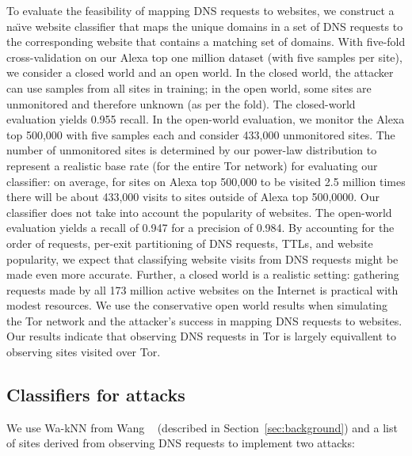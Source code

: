 To evaluate the feasibility of mapping DNS requests to websites, we
construct a na\"{\i}ve website classifier that maps the unique domains
in a set of DNS requests to the corresponding website that contains a
matching set of domains.  With five-fold cross-validation on our Alexa
top one million dataset (with five samples per site),
we consider a closed world and an open world.
In the closed world, the attacker can use samples
from all sites in training; in the open world, some sites
are unmonitored and therefore unknown (as per the fold).  The
closed-world evaluation yields 0.955 recall.  In the open-world
evaluation, we monitor the Alexa top 500,000 with five samples each and
consider 433,000 unmonitored sites.  The number of unmonitored sites is
determined by our power-law
distribution to represent a realistic base rate (for the entire Tor network)
for evaluating our classifier: on average, for sites on Alexa top 500,000
to be visited 2.5 million times there will be about 433,000 visits to sites
outside of Alexa top 500,0000.  Our classifier does not take into account the
popularity of websites.
The open-world evaluation yields a
recall of 0.947 for a precision of 0.984.  By accounting for the order
of requests, per-exit partitioning of DNS requests, TTLs, and website
popularity, we expect that classifying website visits from DNS requests
might be made even more accurate.
Further, a closed world is a realistic setting:
gathering requests made by all 173 million active websites on the
Internet is practical with modest resources.
We use the conservative open world results when simulating the Tor network and
the attacker's success in mapping DNS requests to websites.
Our results indicate that observing DNS requests in Tor is
largely equivallent to observing sites visited over Tor.

\subsection{Classifiers for \name attacks}

We use Wa-kNN from Wang \ea~\cite{Wang2014a} (described in
Section~\ref{sec:background}) and a list of sites derived from
observing DNS requests to implement two \name attacks:

